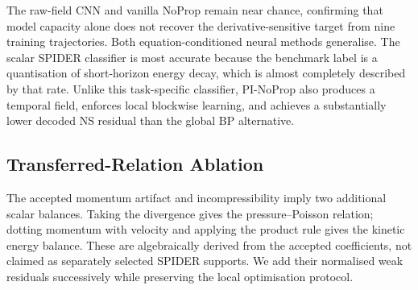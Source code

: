\documentclass[preprint,12pt]{elsarticle}
\begin{document}
\begin{table}[htbp]
\centering
\caption{Expanded trajectory-disjoint baseline comparison over three seeds.
A dash indicates that the method does not reconstruct a temporal field, so a
decoded-field NS residual is not defined.}
\label{tab:expanded-baselines}
\end{table}

The raw-field CNN and vanilla NoProp remain near chance, confirming that model
capacity alone does not recover the derivative-sensitive target from nine
training trajectories. Both equation-conditioned neural methods generalise.
The scalar SPIDER classifier is most accurate because the benchmark label is a
quantisation of short-horizon energy decay, which is almost completely
described by that rate. Unlike this task-specific classifier, PI-NoProp also
produces a temporal field, enforces local blockwise learning, and achieves a
substantially lower decoded NS residual than the global BP alternative.

\subsection{Transferred-Relation Ablation}
\label{sec:relation-ablation}

The accepted momentum artifact and incompressibility imply two additional
scalar balances. Taking the divergence gives the pressure--Poisson relation;
dotting momentum with velocity and applying the product rule gives the kinetic
energy balance. These are algebraically derived from the accepted coefficients,
not claimed as separately selected SPIDER supports. We add their normalised
weak residuals successively while preserving the local optimisation protocol.
\end{document}
